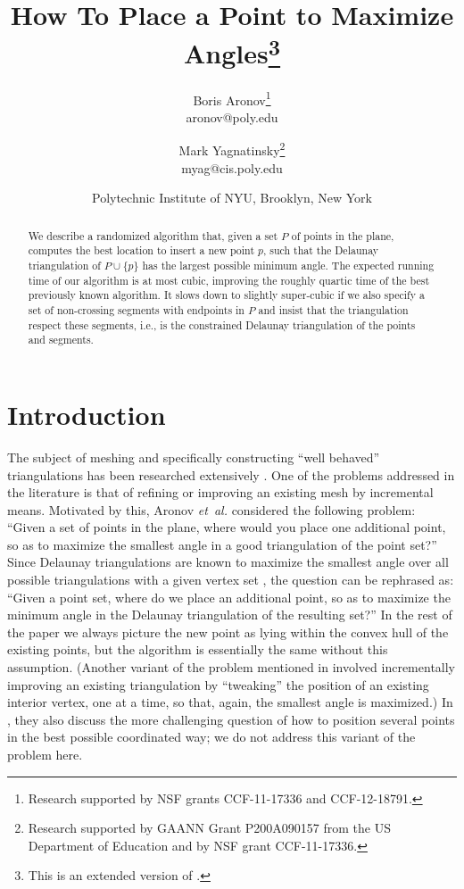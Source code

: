 \documentclass{cccg13}
\begin{document}
\title{How To Place a Point to Maximize Angles\thanks{This is an extended version of \cite{c3g}.}}
\author{
	Boris Aronov\thanks{
		Research supported by NSF grants CCF-11-17336 and CCF-12-18791.}\\
	aronov@poly.edu
	\and Mark Yagnatinsky\thanks{
		Research supported by GAANN Grant P200A090157 from the US Department of Education and by NSF grant CCF-11-17336.}\\
  myag@cis.poly.edu
}
\date{\ifcccg\normalsize\fi Polytechnic Institute of NYU, Brooklyn, New York}
\maketitle
\begin{abstract}
  We describe a randomized algorithm that, given a set $P$ of points in the plane, computes the best location to insert a new point $p$, such that the Delaunay triangulation of $P\cup\{p\}$ has the largest possible minimum angle.  The expected running time of our algorithm is at most cubic, improving the roughly quartic time of the best previously known algorithm.  It slows down to slightly super-cubic if we also specify a set of non-crossing segments with endpoints in $P$ and insist that the triangulation respect these segments, i.e., is the constrained Delaunay triangulation of the points and segments.
\end{abstract}

\section{Introduction}
The subject of meshing and specifically constructing ``well behaved'' triangulations has been researched extensively \cite{mesh}.  One of the problems addressed in the literature is that of refining or improving an existing mesh by incremental means.  Motivated by this, Aronov \emph{et~al.} \cite{orig} considered the following problem: ``Given a set of points in the plane, where would you place one additional point, so as to maximize the smallest angle in a good triangulation of the point set?''  Since Delaunay triangulations are known to maximize the smallest angle over all possible triangulations with a given vertex set \cite{Delaunay-good}, the question can be rephrased as: ``Given a point set, where do we place an additional point, so as to maximize the minimum angle in the Delaunay triangulation of the resulting set?''  In the rest of the paper we always picture the new point as lying within the convex hull of the existing points, but the algorithm is essentially the same without this assumption.  (Another variant of the problem mentioned in \cite{orig} involved incrementally improving an existing triangulation by ``tweaking'' the position of an existing interior vertex, one at a time, so that, again, the smallest angle is maximized.)  In \cite{orig}, they also discuss the more challenging question of how to position several points in the best possible coordinated way; we do not address this variant of the problem here.
\end{document}
